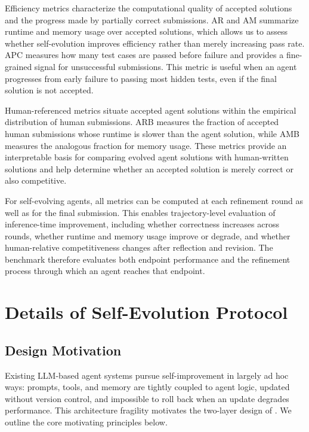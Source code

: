 Efficiency metrics characterize the computational quality of accepted solutions and the progress made by partially correct submissions. AR and AM summarize runtime and memory usage over accepted solutions, which allows us to assess whether self-evolution improves efficiency rather than merely increasing pass rate. APC measures how many test cases are passed before failure and provides a fine-grained signal for unsuccessful submissions. This metric is useful when an agent progresses from early failure to passing most hidden tests, even if the final solution is not accepted.

Human-referenced metrics situate accepted agent solutions within the empirical distribution of human submissions. ARB measures the fraction of accepted human submissions whose runtime is slower than the agent solution, while AMB measures the analogous fraction for memory usage. These metrics provide an interpretable basis for comparing evolved agent solutions with human-written solutions and help determine whether an accepted solution is merely correct or also competitive.

For self-evolving agents, all metrics can be computed at each refinement round as well as for the final submission. This enables trajectory-level evaluation of inference-time improvement, including whether correctness increases across rounds, whether runtime and memory usage improve or degrade, and whether human-relative competitiveness changes after reflection and revision. The benchmark therefore evaluates both endpoint performance and the refinement process through which an agent reaches that endpoint.


\section{Details of Self-Evolution Protocol}

\subsection{Design Motivation}

Existing LLM-based agent systems pursue self-improvement in largely ad hoc ways: prompts, tools, and memory are tightly coupled to agent logic, updated without version control, and impossible to roll back when an update degrades performance. This architecture fragility motivates the two-layer design of \projectname. We outline the core motivating principles below.

